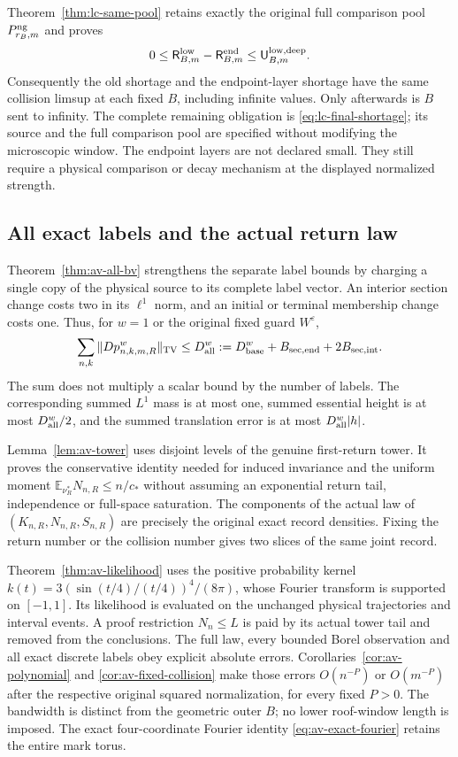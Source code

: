 Theorem~\ref{thm:lc-same-pool} retains exactly the original full
comparison pool $P^{\rm ng}_{r_B,m}$ and proves
\[
 0\le\mathsf R^{\rm low}_{B,m}-\mathsf R^{\rm end}_{B,m}
                  \le\mathsf U^{\rm low,deep}_{B,m}.
\]
Consequently the old shortage and the endpoint-layer shortage
have the same collision limsup at each fixed $B$, including
infinite values. Only afterwards is $B$ sent to infinity.
The complete remaining obligation is
\eqref{eq:lc-final-shortage}; its source and the full comparison
pool are specified without modifying the microscopic window.
The endpoint layers are not declared small. They still require
a physical comparison or decay mechanism at the displayed
normalized strength.

\subsection*{All exact labels and the actual return law}
Theorem~\ref{thm:av-all-bv} strengthens the separate label bounds
by charging a single copy of the physical source to its complete
label vector. An interior section change costs two in its
$\ell^1$ norm, and an initial or terminal membership change costs
one. Thus, for $w=1$ or the original fixed guard $W^\varepsilon$,
\begin{equation}\label{eq:intro-all-labels}
 \sum_{n,k}\|Dp^w_{n,k,m,R}\|_{\rm TV}
    \le D_{\rm all}^w
    :=D_{\rm base}^w+B_{\rm sec,end}+2B_{\rm sec,int}.
\end{equation}
The sum does not multiply a scalar bound by the number of labels.
The corresponding summed $L^1$ mass is at most one, summed
essential height is at most $D_{\rm all}^w/2$, and the summed
translation error is at most $D_{\rm all}^w|h|$.

Lemma~\ref{lem:av-tower} uses disjoint levels of the genuine
first-return tower. It proves the conservative identity needed
for induced invariance and the uniform moment
$\mathbb E_{\nu_R^*}N_{n,R}\le n/c_*$ without assuming an
exponential return tail, independence or full-space saturation.
The components of the actual law of
$(K_{n,R},N_{n,R},S_{n,R})$ are precisely the original exact
record densities. Fixing the return number or the collision
number gives two slices of the same joint record.

Theorem~\ref{thm:av-likelihood} uses the positive probability
kernel
$k(t)=3(\sin(t/4)/(t/4))^4/(8\pi)$, whose Fourier transform
is supported on $[-1,1]$. Its likelihood is evaluated on the
unchanged physical trajectories and interval events. A proof
restriction $N_n\le L$ is paid by its actual tower tail and
removed from the conclusions. The full law, every bounded
Borel observation and all exact discrete labels obey explicit
absolute errors. Corollaries~\ref{cor:av-polynomial} and
\ref{cor:av-fixed-collision} make those errors $O(n^{-P})$
or $O(m^{-P})$ after the respective original squared
normalization, for every fixed $P>0$. The bandwidth is distinct
from the geometric outer $B$; no lower roof-window length is
imposed. The exact four-coordinate Fourier identity
\eqref{eq:av-exact-fourier} retains the entire mark torus.

